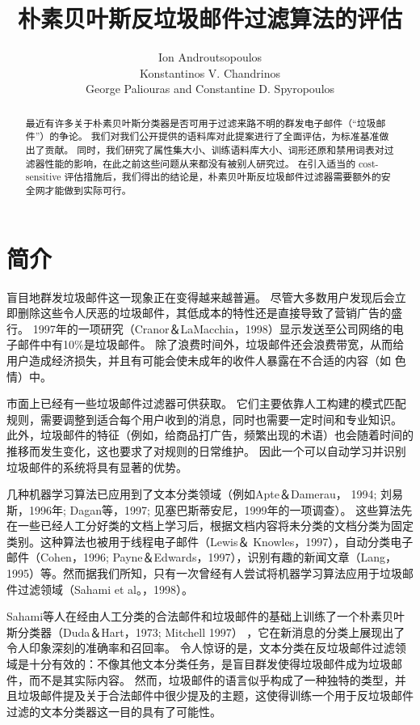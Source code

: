 \documentclass[UTF8]{ctexart}
\title{朴素贝叶斯反垃圾邮件过滤算法的评估}
\author{Ion Androutsopoulos\\ Konstantinos V. Chandrinos\\George Paliouras
	and Constantine D. Spyropoulos}
\date{}
\begin{document}
\maketitle
\begin{abstract}
最近有许多关于朴素贝叶斯分类器是否可用于过滤来路不明的群发电子邮件（“垃圾邮件”）的争论。 我们对我们公开提供的语料库对此提案进行了全面评估，为标准基准做出了贡献。 同时，我们研究了属性集大小、训练语料库大小、词形还原和禁用词表对过滤器性能的影响，在此之前这些问题从来都没有被别人研究过。 在引入适当的 cost-sensitive 评估措施后，我们得出的结论是，朴素贝叶斯反垃圾邮件过滤器需要额外的安全网才能做到实际可行。	
\end{abstract}

\section{简介}
盲目地群发垃圾邮件这一现象正在变得越来越普遍。 尽管大多数用户发现后会立即删除这些令人厌恶的垃圾邮件，其低成本的特性还是直接导致了营销广告的盛行。 1997年的一项研究（Cranor＆LaMacchia，1998）显示发送至公司网络的电子邮件中有10\%是垃圾邮件。 除了浪费时间外，垃圾邮件还会浪费带宽，从而给用户造成经济损失，并且有可能会使未成年的收件人暴露在不合适的内容（如 色情）中。 

市面上已经有一些垃圾邮件过滤器可供获取。  它们主要依靠人工构建的模式匹配规则，需要调整到适合每个用户收到的消息，同时也需要一定时间和专业知识。 此外，垃圾邮件的特征（例如，给商品打广告，频繁出现的术语）也会随着时间的推移而发生变化，这也要求了对规则的日常维护。 因此一个可以自动学习并识别垃圾邮件的系统将具有显著的优势。

几种机器学习算法已应用到了文本分类领域（例如Apte＆Damerau， 1994; 刘易斯，1996年; Dagan等，1997; 见塞巴斯蒂安尼，1999年的一项调查）。 这些算法先在一些已经人工分好类的文档上学习后，根据文档内容将未分类的文档分类为固定类别。这种算法也被用于线程电子邮件（Lewis＆ Knowles，1997），自动分类电子邮件（Cohen，1996; Payne＆Edwards，1997），识别有趣的新闻文章（Lang，1995）等。然而据我们所知，只有一次曾经有人尝试将机器学习算法应用于垃圾邮件过滤领域（Sahami et al。，1998）。 

Sahami等人在经由人工分类的合法邮件和垃圾邮件的基础上训练了一个朴素贝叶斯分类器（Duda＆Hart，1973; Mitchell 1997） ，它在新消息的分类上展现出了令人印象深刻的准确率和召回率。 令人惊讶的是，文本分类在反垃圾邮件过滤领域是十分有效的：不像其他文本分类任务，是盲目群发使得垃圾邮件成为垃圾邮件，而不是其实际内容。 然而，垃圾邮件的语言似乎构成了一种独特的类型，并且垃圾邮件提及关于合法邮件中很少提及的主题，这使得训练一个用于反垃圾邮件过滤的文本分类器这一目的具有了可能性。
\end{document}
